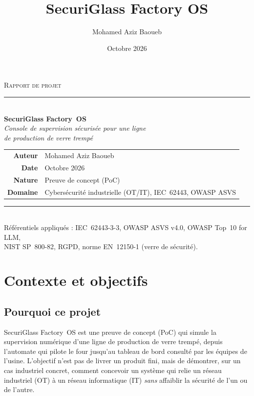 \documentclass[11pt,a4paper]{report}
\title{SecuriGlass Factory OS}
\author{Mohamed Aziz Baoueb}
\date{Octobre 2026}
\begin{document}
\begin{titlepage}
  \centering
  \vspace*{2.2cm}

  {\Large\scshape Rapport de projet}\\[0.6cm]
  \textcolor{rulegray}{\rule{0.5\linewidth}{0.4pt}}\\[1.4cm]

  {\fontsize{32}{38}\selectfont\bfseries\color{accent} SecuriGlass Factory~OS}\\[0.5cm]
  {\Large\itshape Console de supervision sécurisée pour une ligne\\
  de production de verre trempé}\\[2.2cm]

  \begin{tabular}{rl}
    \textbf{Auteur} & Mohamed Aziz Baoueb \\[4pt]
    \textbf{Date} & Octobre 2026 \\[4pt]
    \textbf{Nature} & Preuve de concept (PoC) \\[4pt]
    \textbf{Domaine} & Cybersécurité industrielle (OT/IT), IEC~62443, OWASP ASVS \\
  \end{tabular}

  \vfill
  \textcolor{rulegray}{\rule{0.5\linewidth}{0.4pt}}\\[0.4cm]
  {\small Référentiels appliqués : IEC~62443-3-3, OWASP ASVS v4.0, OWASP Top~10 for LLM,\\
  NIST SP~800-82, RGPD, norme EN~12150-1 (verre de sécurité).}
\end{titlepage}

\tableofcontents

\chapter{Contexte et objectifs}

\section{Pourquoi ce projet}
SecuriGlass Factory~OS est une preuve de concept (PoC) qui simule la supervision
numérique d'une ligne de production de verre trempé, depuis l'automate qui pilote
le four jusqu'au tableau de bord consulté par les équipes de l'usine. L'objectif
n'est pas de livrer un produit fini, mais de démontrer, sur un cas industriel
concret, comment concevoir un système qui relie un réseau industriel (OT) à un
réseau informatique (IT) \emph{sans} affaiblir la sécurité de l'un ou de l'autre.
\end{document}
